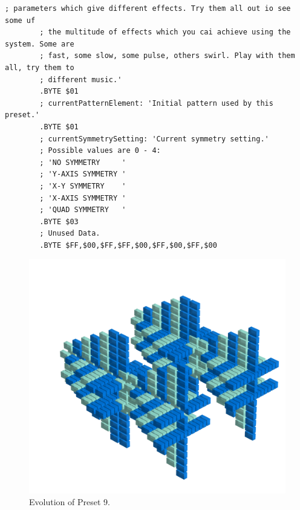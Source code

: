 \begin{lstlisting}[basicstyle=\ttfamily\tiny,caption=Source code for Preset 8.]
        ; parameters which give different effects. Try them all out io see some uf
        ; the multitude of effects which you cai achieve using the system. Some are
        ; fast, some slow, some pulse, others swirl. Play with them all, try them to
        ; different music.'
        .BYTE $01
        ; currentPatternElement: 'Initial pattern used by this preset.'
        .BYTE $01
        ; currentSymmetrySetting: 'Current symmetry setting.'
        ; Possible values are 0 - 4:
        ; 'NO SYMMETRY     '
        ; 'Y-AXIS SYMMETRY '
        ; 'X-Y SYMMETRY    '
        ; 'X-AXIS SYMMETRY '
        ; 'QUAD SYMMETRY   '
        .BYTE $03
        ; Unused Data.
        .BYTE $FF,$00,$FF,$FF,$00,$FF,$00,$FF,$00
\end{lstlisting}


\clearpage                                                                 
\begin{figure}[H]                                                          
    \centering                                                             
    \begin{adjustbox}{width=14cm,center}                                   
      \includegraphics[width=14cm]{src/presets/pattern9-45.png}%
    \end{adjustbox}                                                        
\caption{Evolution of Preset 9.}                                           
\end{figure}                                                               
\clearpage                                                                 
                                                                           
